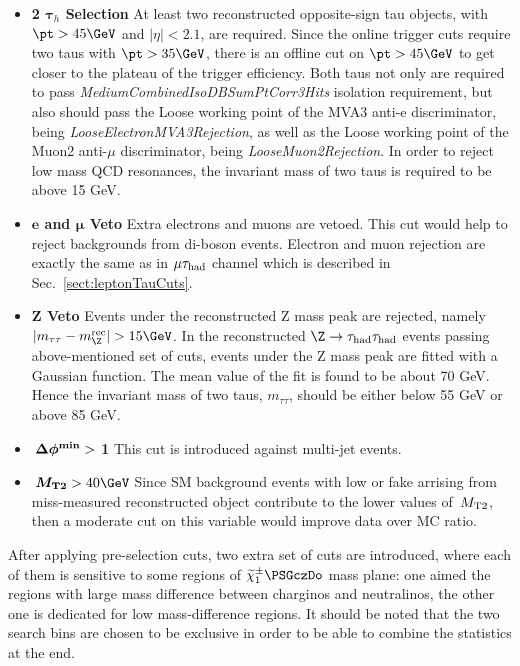 \begin{itemize}
\item \textbf{2 $\boldsymbol\tau_h$ Selection} At least two reconstructed opposite-sign tau objects, 
with $\pt>45\GeV$ and $|\eta|<2.1$, are required. Since the online trigger cuts require two taus with 
$\pt>35\GeV$, there is an offline cut on $\pt>45\GeV$ to get closer to the plateau of the trigger efficiency. 
Both taus not only are required to pass \emph{MediumCombinedIsoDBSumPtCorr3Hits} isolation requirement, 
but also should pass the Loose working point of the MVA3 anti-e discriminator, being \emph{LooseElectronMVA3Rejection}, 
as well as the Loose working point of the Muon2 anti-$\mu$ discriminator, being \emph{LooseMuon2Rejection}. 
In order to reject low mass QCD resonances, the invariant mass of two taus is required to be above 15 GeV. 
\item \textbf{$\boldsymbol e$ and $\boldsymbol\mu$ Veto} Extra electrons and muons are vetoed. This 
cut would help to reject backgrounds from di-boson events. Electron and muon rejection 
are exactly the same as in $\mu\tau_{\rm had}$ channel which is described in Sec.~\ref{sect:leptonTauCuts}.
\item \textbf{Z Veto} Events under the reconstructed Z mass peak are rejected, namely $|m_{\tau\tau}-m_{\Z}^{\rm rec}|>15\GeV$. 
In the reconstructed $\Z\rightarrow \Tau\Tau$ events passing above-mentioned set of cuts, events under the Z mass peak are fitted 
with a Gaussian function. The mean value of the fit is found to be about 70 GeV. Hence the invariant mass of two taus, $m_{\tau\tau}$, should be 
either below 55 GeV or above 85 GeV.  
\item \textbf{$\boldsymbol{\,{\Delta\phi^{\rm min}}} > $ 1} This cut is introduced against multi-jet events.  
\item \textbf{$\boldsymbol\mttwo>40\GeV$} Since SM background events with low \MET or fake \MET arrising from miss-measured reconstructed object
 contribute to the lower values of $\,{M_{\rm T2}}$, then a moderate cut on this variable would improve data over MC ratio.  
\end{itemize}
After applying pre-selection cuts, two extra set of cuts are introduced, where each of them is sensitive to some regions of $\chione\PSGczDo$ mass plane: one aimed the regions with large mass difference between charginos and neutralinos, the other one is dedicated for low mass-difference regions. It should be noted that the two search bins are chosen to be exclusive in order to be able to combine the statistics at the end.
